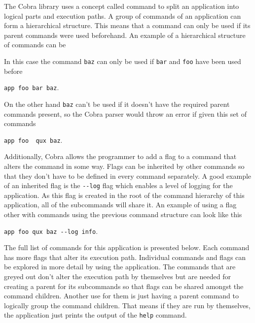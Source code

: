 The Cobra library uses a concept called command to split an application into logical parts and execution paths. A group of commands of an application can form a hierarchical structure. This means that a command can only be used if its parent commands were used beforehand. An example of a hierarchical structure of commands can be

\vspace{0.5em}
\vspace{0.5em}

\noindent In this case the command \texttt{baz} can only be used if \texttt{bar} and \texttt{foo} have been used before
\begin{center}
  \texttt{app foo bar baz}.
\end{center}
On the other hand \texttt{baz} can't be used if it doesn't have the required parent commands present, so the Cobra parser would throw an error if given this set of commands
\begin{center}
  \texttt{app foo {\color{red} qux} baz}.
\end{center}
Additionally, Cobra allows the programmer to add a flag to a command that alters the command in some way. Flags can be inherited by other commands so that they don't have to be defined in every command separately. A good example of an inherited flag is the \texttt{-\--log} flag which enables a level of logging for the application. As this flag is created in the root of the command hierarchy of this application, all of the subcommands will share it. An example of using a flag other with commands using the previous command structure can look like this
\begin{center}
  \texttt{app foo qux baz -\--log info}.
\end{center}

The full list of commands for this application is presented below. Each command has more flags that alter its execution path. Individual commands and flags can be explored in more detail by using the application. The commands that are greyed out don't alter the execution path by themselves but are needed for creating a parent for its subcommands so that flags can be shared amongst the command children. Another use for them is just having a parent command to logically group the command children. That means if they are run by themselves, the application just prints the output of the \texttt{help} command.

\vspace{0.5em}

